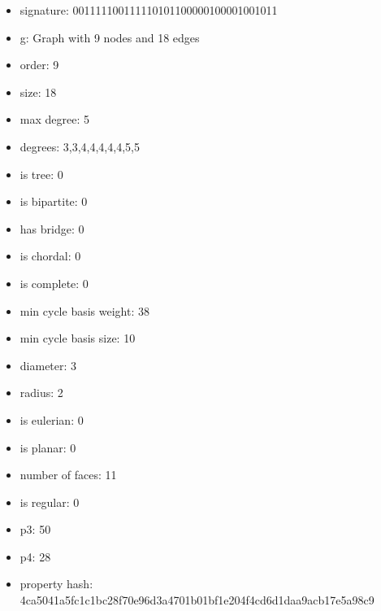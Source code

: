 \newpage
\begin{figure}
\end{figure}
\begin{itemize}
\item signature: 001111100111110101100000100001001011
\item g: Graph with 9 nodes and 18 edges
\item order: 9
\item size: 18
\item max degree: 5
\item degrees: 3,3,4,4,4,4,4,5,5
\item is tree: 0
\item is bipartite: 0
\item has bridge: 0
\item is chordal: 0
\item is complete: 0
\item min cycle basis weight: 38
\item min cycle basis size: 10
\item diameter: 3
\item radius: 2
\item is eulerian: 0
\item is planar: 0
\item number of faces: 11
\item is regular: 0
\item p3: 50
\item p4: 28
\item property hash: 4ca5041a5fc1c1bc28f70e96d3a4701b01bf1e204f4cd6d1daa9acb17e5a98c9
\end{itemize}
